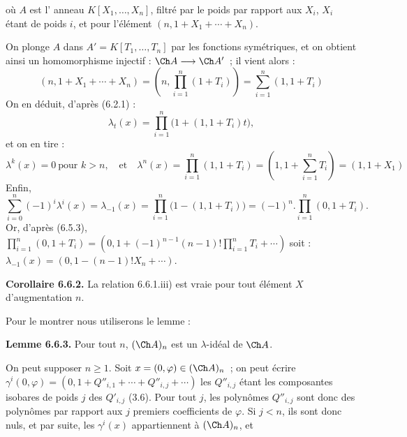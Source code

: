 où \(A\) est l'%
anneau \(K[X_1,\ldots,X_n]\), filtré par le poids par rapport aux \(X_i\), \(X_i\) étant de poids \(i\), et pour l'élément \((n,1+X_1+\cdots+X_n)\).

On plonge \(A\) dans \(A'=K[T_1,\ldots,T_n]\) par les fonctions symétriques, et on obtient ainsi un homomorphisme injectif : \(\Ch A\longrightarrow\Ch A'\)~; il vient alors :
\[
 (n,1+X_1+\cdots+X_n)
 =
 \left(n,\prod_{i=1}^n(1+T_i)\right)
 =
 \sum_{i=1}^n(1,1+T_i)
\]
On en déduit, d'après (6.2.1) :
\[
  \lambda_t(x)=\prod_{i=1}^n\bigl(1+(1,1+T_i)t\bigr),
\]
et on en tire :
\[
  \lambda^k(x)=0\ \text{pour }k>n,\quad\text{et}\quad
  \lambda^n(x)=\prod_{i=1}^n(1,1+T_i)
   =\left(1,1+\sum_{i=1}^nT_i\right)=(1,1+X_1)
\]
Enfin,
\[
  \sum_{i=0}^n(-1)^i\lambda^i(x)=\lambda_{-1}(x)
  =
  \prod_{i=1}^n\bigl(1-(1,1+T_i)\bigr)
  =
  (-1)^n.\prod_{i=1}^n(0,1+T_i).
\]
Or, d'après (6.5.3), \(\prod_{i=1}^n(0,1+T_i)=\left(0,1+(-1)^{n-1}(n-1)!\prod_{i=1}^nT_i+\cdots\right)\)
soit : \(\lambda_{-1}(x)=(0,1-(n-1)!X_n+\cdots)\).

\textbf{Corollaire 6.6.2.} La relation 6.6.1.iii) est vraie pour tout élément \(X\) d'augmentation \(n\).

Pour le montrer nous utiliserons le lemme :

\textbf{Lemme 6.6.3.} Pour tout \(n\), \((\Ch A)_n\) est un \(\lambda\)-idéal de \(\Ch A\).

On peut supposer \(n\ge1\). Soit \(x=(0,\varphi)\in(\Ch A)_n\)~; on peut écrire \(\gamma^i(0,\varphi)=(0,1+Q''_{i,1}+\cdots+Q''_{i,j}+\cdots)\) les \(Q''_{i,j}\) étant les composantes isobares de poids \(j\) des \(Q'_{i,j}\) (3.6). Pour tout \(j\), les polynômes \(Q''_{i,j}\) sont donc des polynômes par rapport aux \(j\) premiers coefficients de \(\varphi\). Si \(j<n\), ils sont donc nuls, et par suite, les \(\gamma^i(x)\) appartiennent à \((\Ch A)_n\), et 
